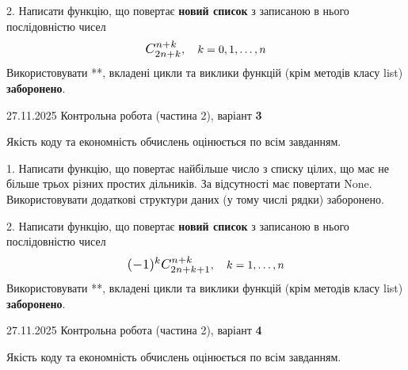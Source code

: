 \documentclass[11pt, ukrainian]{article}
\begin{document}
{{\begin {large}
2. 
Написати функцію, що повертає \textbf{новий список} з записаною в нього послідовністю чисел
$$\scalebox{1.2}{$C_{2n+k}^{n+k}$}, \quad k=0,1,\ldots,n$$
Використовувати **, вкладені цикли та виклики функцій (крім методів класу list) \textbf{заборонено}.

\end{large}
\newpage
{{27.11.2025 Контрольна робота  (частина 2), варіант  \No \textbf { 3 }\par}}


{
\begin {large}
Якість коду та економність обчислень оцінюється по всім завданням.


1. Написати функцію, що повертає найбільше число з списку цілих, що має не більше трьох різних простих дільників. За відсутності має повертати None. Використовувати додаткові структури даних (у тому числі рядки) заборонено.


2. 
Написати функцію, що повертає \textbf{новий список} з записаною в нього послідовністю чисел
$$\scalebox{1.2}{$(-1)^{k}C_{2n+k+1}^{n+k}$}, \quad k=1,\ldots,n$$
Використовувати **, вкладені цикли та виклики функцій (крім методів класу list) \textbf{заборонено}.

\end{large}
\newpage
{{27.11.2025 Контрольна робота  (частина 2), варіант  \No \textbf { 4 }\par}}


{
\begin {large}
Якість коду та економність обчислень оцінюється по всім завданням.



\end{large}}}}}
\end{document}
